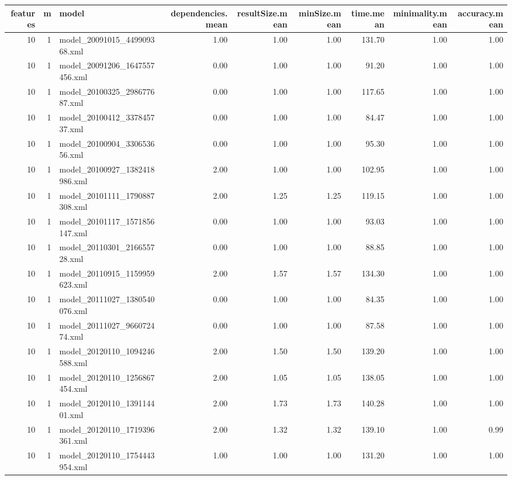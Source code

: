 \begin{table}[ht]
\centering
\begin{tabular}{rrlrrrrrr}
  \hline
features & m & model & dependencies.mean & resultSize.mean & minSize.mean & time.mean & minimality.mean & accuracy.mean \\ 
  \hline
 10 &   1 & model\_20091015\_449909368.xml & 1.00 & 1.00 & 1.00 & 131.70 & 1.00 & 1.00 \\ 
   10 &   1 & model\_20091206\_1647557456.xml & 0.00 & 1.00 & 1.00 & 91.20 & 1.00 & 1.00 \\ 
   10 &   1 & model\_20100325\_298677687.xml & 0.00 & 1.00 & 1.00 & 117.65 & 1.00 & 1.00 \\ 
   10 &   1 & model\_20100412\_337845737.xml & 0.00 & 1.00 & 1.00 & 84.47 & 1.00 & 1.00 \\ 
   10 &   1 & model\_20100904\_330653656.xml & 0.00 & 1.00 & 1.00 & 95.30 & 1.00 & 1.00 \\ 
   10 &   1 & model\_20100927\_1382418986.xml & 2.00 & 1.00 & 1.00 & 102.95 & 1.00 & 1.00 \\ 
   10 &   1 & model\_20101111\_1790887308.xml & 2.00 & 1.25 & 1.25 & 119.15 & 1.00 & 1.00 \\ 
   10 &   1 & model\_20101117\_1571856147.xml & 0.00 & 1.00 & 1.00 & 93.03 & 1.00 & 1.00 \\ 
   10 &   1 & model\_20110301\_216655728.xml & 0.00 & 1.00 & 1.00 & 88.85 & 1.00 & 1.00 \\ 
   10 &   1 & model\_20110915\_1159959623.xml & 2.00 & 1.57 & 1.57 & 134.30 & 1.00 & 1.00 \\ 
   10 &   1 & model\_20111027\_1380540076.xml & 0.00 & 1.00 & 1.00 & 84.35 & 1.00 & 1.00 \\ 
   10 &   1 & model\_20111027\_966072474.xml & 0.00 & 1.00 & 1.00 & 87.58 & 1.00 & 1.00 \\ 
   10 &   1 & model\_20120110\_1094246588.xml & 2.00 & 1.50 & 1.50 & 139.20 & 1.00 & 1.00 \\ 
   10 &   1 & model\_20120110\_1256867454.xml & 2.00 & 1.05 & 1.05 & 138.05 & 1.00 & 1.00 \\ 
   10 &   1 & model\_20120110\_139114401.xml & 2.00 & 1.73 & 1.73 & 140.28 & 1.00 & 1.00 \\ 
   10 &   1 & model\_20120110\_1719396361.xml & 2.00 & 1.32 & 1.32 & 139.10 & 1.00 & 0.99 \\ 
   10 &   1 & model\_20120110\_1754443954.xml & 1.00 & 1.00 & 1.00 & 131.20 & 1.00 & 1.00 \\ 

\end{tabular}
\end{table}
